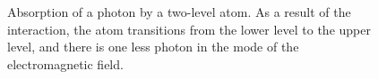 \begin{figure}
\centering



\caption{Absorption of a photon by a two-level atom. As a result
  of the interaction, the atom transitions from the lower level to the upper level, and there is one less photon in the mode
  of the electromagnetic field.}
\label{figPart1Ch2_3}
\end{figure}